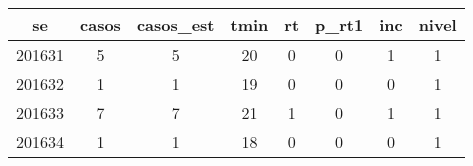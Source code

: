 \begin{tabular}{c|ccccccc}
  \hline
se & casos & casos\_est & tmin & rt & p\_rt1 & inc & nivel \\ 
  \hline
201631 & 5 & 5 & 20 & 0 & 0 & 1 & 1 \\ 
  201632 & 1 & 1 & 19 & 0 & 0 & 0 & 1 \\ 
  201633 & 7 & 7 & 21 & 1 & 0 & 1 & 1 \\ 
  201634 & 1 & 1 & 18 & 0 & 0 & 0 & 1 \\ 
   \hline
\end{tabular}
